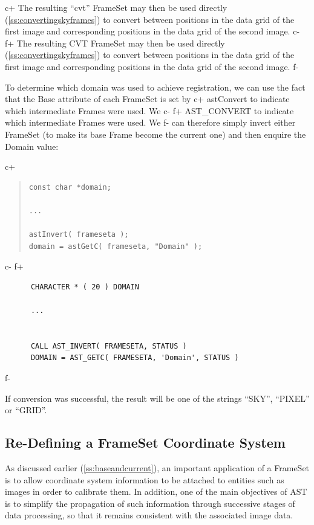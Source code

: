 \documentclass[twoside,11pt]{article}
\newcommand{\secref}[1]{\S\ref{#1}}
\renewcommand{\secref}[1]{\ref{#1}}
\begin{document}
c+
The resulting ``cvt'' FrameSet may then be used directly
(\secref{ss:convertingskyframes}) to convert between positions in the
data grid of the first image and corresponding positions in the data
grid of the second image.
c-
f+
The resulting CVT FrameSet may then be used directly
(\secref{ss:convertingskyframes}) to convert between positions in the
data grid of the first image and corresponding positions in the data
grid of the second image.
f-

To determine which domain was used to achieve registration,
we can use the fact that the Base attribute of each FrameSet is set by
c+
astConvert to indicate which intermediate Frames were used. We
c-
f+
AST\_CONVERT to indicate which intermediate Frames were used. We
f-
can therefore simply invert either FrameSet (to make its base Frame
become the current one) and then enquire the Domain value:

c+
\begin{quote}
\small
\begin{verbatim}
const char *domain;

...

astInvert( frameseta );
domain = astGetC( frameseta, "Domain" );
\end{verbatim}
\normalsize
\end{quote}
c-
f+
\small
\begin{verbatim}
      CHARACTER * ( 20 ) DOMAIN

      ...


      CALL AST_INVERT( FRAMESETA, STATUS )
      DOMAIN = AST_GETC( FRAMESETA, 'Domain', STATUS )
\end{verbatim}
\normalsize
f-

If conversion was successful, the result will be one of the strings
``SKY'', ``PIXEL'' or ``GRID''.

\subsection{\label{ss:remapframe}Re-Defining a FrameSet Coordinate System}

As discussed earlier (\secref{ss:baseandcurrent}), an important
application of a FrameSet is to allow coordinate system information to
be attached to entities such as images in order to calibrate them. In
addition, one of the main objectives of AST is to simplify the
propagation of such information through successive stages of data
processing, so that it remains consistent with the associated image
data.
\end{document}
